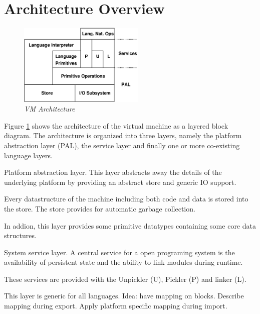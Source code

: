 \section{Architecture Overview}
\begin{figure}[ht]
\centering
\includegraphics[width=6cm]{figures/architecture.eps}
\caption{\label{vm_architecture} {\it VM Architecture}}
\end{figure}
Figure \ref{vm_architecture} shows the architecture of the virtual
machine as a layered block diagram.
The architecture is organized into three layers, namely
the platform abstraction layer (PAL),
the service layer and finally one or more co-existing
language layers.
\begin{paragraph}{Platform abstraction layer.}
This layer abstracts away the details of the underlying platform
by providing an abstract store and generic IO support.

Every datastructure of the machine including both code and data
is stored into the store. The store provides for automatic garbage collection.

In addion, this layer provides some primitive datatypes
containing some core data structures.
\end{paragraph}
\begin{paragraph}{System service layer.}
A central service for a open programing system is the availability
of persistent state and the ability to link modules during runtime.

These services are provided with the Unpickler (U), Pickler (P) and linker (L).

This layer is generic for all languages. Idea:
have mapping on blocks. Describe mapping during export.
Apply platform specific mapping during import.
\end{paragraph}
